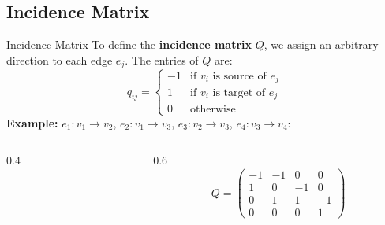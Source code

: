 \documentclass{beamer}
\begin{document}
\subsection{Incidence Matrix}
\begin{frame}[fragile]{Incidence Matrix}
    To define the \textbf{incidence matrix} $Q$, we assign an arbitrary direction to each edge $e_j$. The entries of $Q$ are:
    \[q_{ij} = \begin{cases} -1 & \text{if } v_i \text{ is source of } e_j \\ 1 & \text{if } v_i \text{ is target of } e_j \\ 0 & \text{otherwise} \end{cases}\]
    \vfill
    \textbf{Example:} $e_1: v_1 \to v_2$, $e_2: v_1 \to v_3$, $e_3: v_2 \to v_3$, $e_4: v_3 \to v_4$:
    \begin{columns}
        \begin{column}{0.4\textwidth}
            \begin{center}
            \end{center}
        \end{column}
        \begin{column}{0.6\textwidth}
            \[Q = \begin{pmatrix} -1 & -1 & 0 & 0 \\ 1 & 0 & -1 & 0 \\ 0 & 1 & 1 & -1 \\ 0 & 0 & 0 & 1 \end{pmatrix}\]
        \end{column}
    \end{columns}
\end{frame}
\end{document}
